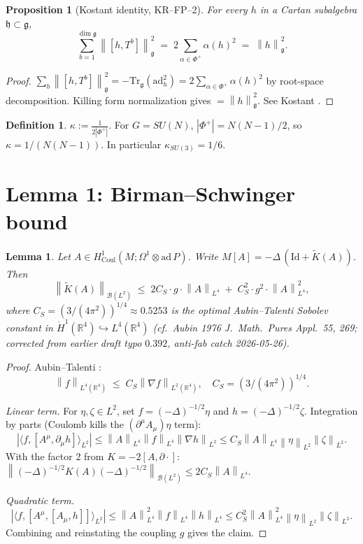 \documentclass[11pt,a4paper]{amsart}
\newtheorem{lemma}[theorem]{Lemma}
\newtheorem{proposition}[theorem]{Proposition}
\theoremstyle{definition}
\newtheorem{definition}[theorem]{Definition}
\newcommand{\R}{\mathbb{R}}
\newcommand{\g}{\mathfrak{g}}
\newcommand{\h}{\mathfrak{h}}
\newcommand{\norm}[1]{\left\lVert#1\right\rVert}
\newcommand{\abs}[1]{\left\lvert#1\right\rvert}
\newcommand{\inner}[2]{\langle #1, #2\rangle}
\newcommand{\Tr}{\mathrm{Tr}}
\newcommand{\ad}{\mathrm{ad}}
\newcommand{\Coul}{\mathrm{Coul}}
\begin{document}
\begin{proposition}[Kostant identity, KR--FP--2]\label{prop:kostant}
For every $h$ in a Cartan subalgebra $\h \subset \g$,
\[
  \sum_{b=1}^{\dim \g} \norm{[h, T^b]}_{\g}^{2} \;=\; 2 \sum_{\alpha \in \Phi^+} \alpha(h)^{2} \;=\; \norm{h}_{\g}^{2}.
\]
\end{proposition}

\begin{proof}
$\sum_b \norm{[h, T^b]}_{\g}^{2} = -\Tr_{\g}(\ad_h^2) = 2 \sum_{\alpha \in \Phi^+} \alpha(h)^{2}$ by root-space decomposition. Killing form normalization gives $= \norm{h}_{\g}^{2}$. See Kostant \cite[\S 5]{Kostant1959}.
\end{proof}

\begin{definition}\label{def:kappa}
$\kappa := \frac{1}{2|\Phi^+|}$. For $G = SU(N)$, $|\Phi^+| = N(N-1)/2$, so $\kappa = 1/(N(N-1))$. In particular $\kappa_{SU(3)} = 1/6$.
\end{definition}

\section{Lemma 1: Birman--Schwinger bound}
\label{sec:lemma1}

\begin{lemma}\label{lem:BS}
Let $A \in H^1_{\Coul}(M; \Omega^1\otimes \mathrm{ad}\,P)$. Write $M[A] = -\Delta\,(\mathrm{Id} + \widetilde K(A))$. Then
\[
  \norm{\widetilde K(A)}_{\mathcal B(L^2)} \;\leq\; 2 C_S \cdot g \cdot \norm{A}_{L^4} \;+\; C_S^{2} \cdot g^2 \cdot \norm{A}_{L^4}^{2},
\]
where $C_S = (3/(4\pi^2))^{1/4} \approx 0.5253$ is the optimal Aubin--Talenti Sobolev constant in $\dot H^1(\R^4) \hookrightarrow L^4(\R^4)$ (cf.~Aubin 1976 J.~Math.~Pures Appl.~55, 269; corrected from earlier draft typo $0.392$, anti-fab catch 2026-05-26).
\end{lemma}

\begin{proof}
Aubin--Talenti \cite{Aubin1976,Talenti1976}:
\[
  \norm{f}_{L^4(\R^4)} \;\leq\; C_S \norm{\nabla f}_{L^2(\R^4)}, \quad C_S = (3/(4\pi^2))^{1/4}.
\]

\emph{Linear term.} For $\eta, \zeta \in L^2$, set $f = (-\Delta)^{-1/2}\eta$ and $h = (-\Delta)^{-1/2}\zeta$. Integration by parts (Coulomb kills the $(\partial^\mu A_\mu)\eta$ term):
\[
\abs{\inner{f}{[A^\mu, \partial_\mu h]}_{L^2}} \leq \norm{A}_{L^4}\norm{f}_{L^4}\norm{\nabla h}_{L^2} \leq C_S \norm{A}_{L^4} \norm{\eta}_{L^2}\norm{\zeta}_{L^2}.
\]
With the factor 2 from $K = -2[A,\partial \cdot]$: $\norm{(-\Delta)^{-1/2} K(A) (-\Delta)^{-1/2}}_{\mathcal B(L^2)} \leq 2 C_S \norm{A}_{L^4}$.

\emph{Quadratic term.}
\[
\abs{\inner{f}{[A^\mu,[A_\mu,h]]}_{L^2}} \leq \norm{A}_{L^4}^2 \norm{f}_{L^4}\norm{h}_{L^4} \leq C_S^2 \norm{A}_{L^4}^2 \norm{\eta}_{L^2}\norm{\zeta}_{L^2}.
\]
Combining and reinstating the coupling $g$ gives the claim. \qedhere
\end{proof}
\end{document}
